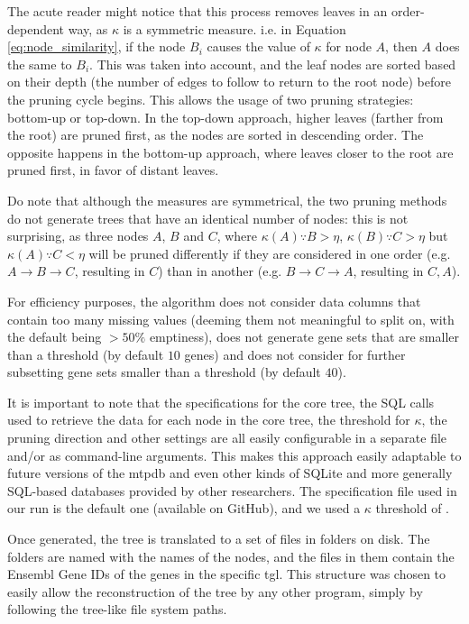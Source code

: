 The acute reader might notice that this process removes leaves in an order-dependent way, as $\kappa$ is a symmetric measure. i.e. in Equation \ref{eq:node_similarity}, if the node $B_i$ causes the value of $\kappa$ for node $A$, then $A$ does the same to $B_i$.
This was taken into account, and the leaf nodes are sorted based on their depth (the number of edges to follow to return to the root node) before the pruning cycle begins.
This allows the usage of two pruning strategies: bottom-up or top-down.
In the top-down approach, higher leaves (farther from the root) are pruned first, as the nodes are sorted in descending order.
The opposite happens in the bottom-up approach, where leaves closer to the root are pruned first, in favor of distant leaves.

Do note that although the measures are symmetrical, the two pruning methods do
not generate trees that have an identical number of nodes:
this is not surprising, as three nodes $A$, $B$ and $C$, where $\kappa(A) \because B > \eta$, $\kappa(B) \because C > \eta$ but $\kappa(A)  \because C < \eta$ will be pruned differently if they are considered in one order (e.g. $A \rightarrow B \rightarrow C$, resulting in $C$) than in another (e.g. $B \rightarrow C \rightarrow A$, resulting in $C, A$).

For efficiency purposes, the algorithm does not consider data columns that contain too many missing values (deeming them not meaningful to split on, with the default being $> 50\%$ emptiness), does not generate gene sets that are smaller than a threshold (by default $10$ genes) and does not consider for further subsetting gene sets smaller than a threshold (by default $40$).

It is important to note that the specifications for the core tree, the SQL calls used to retrieve the data for each node in the core tree, the threshold for $\kappa$, the pruning direction and other settings are all easily configurable in a separate file and/or as command-line arguments.
This makes this approach easily adaptable to future versions of the \gls{mtpdb} and even other kinds of SQLite and more generally SQL-based databases provided by other researchers.
The specification file used in our run is the default one (available on GitHub), and we used a $\kappa$ threshold of .

Once generated, the tree is translated to a set of files in folders on disk. The folders are named with the names of the nodes, and the  files in them contain the Ensembl Gene IDs of the genes in the specific \gls{tgl}. This structure was chosen to easily allow the reconstruction of the tree by any other program, simply by following the tree-like file system paths.

